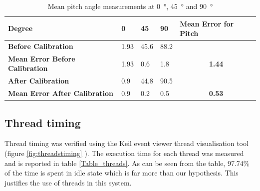 ﻿\documentclass[12pt]{article}
\begin{document}
\begin{table}[!h]
\centering
\caption{Mean pitch angle measurements at \SI{0}{\degree}, \SI{45}{\degree} and \SI{90}{\degree}}
\label{Table_acc_pitch}
\begin{tabular}{lllll}
\hline
\textbf{Degree}                                                                                                                                                                                                             & \textbf{0} & \textbf{45} & \textbf{90} & \textbf{Mean Error for Pitch}
\\ \hline
\textbf{Before Calibration}                                                                                                                                                                                                         & 1.93 & 45.6 & 88.2
\\ \hline
\textbf{Mean Error Before Calibration}                                                                                                                                                                                                             & 1.93 & 0.6 & 1.8 & \multicolumn{1}{c}{\textbf{1.44}}
\\ \hline
\textbf{After	 Calibration}                                                                                                                                                                                                              & 0.9 & 44.8 & 90.5
\\ \hline
\textbf{Mean Error After Calibration}                                                                                                                                                                                                             & 0.9 & 0.2 & 0.5 & \multicolumn{1}{c}{\textbf{0.53}}
\end{tabular}
\end{table}

\subsection{Thread timing}
Thread timing was verified using the Keil event viewer thread visualisation tool (figure \ref{fig:threadstiming}  ). The execution time for each thread was measured and is reported in table \ref{Table_threads}. As can be seen from the table, 97.74\% of the time is spent in idle state which is far more than our hypothesis. This justifies the use of threads in this system.
\end{document}
